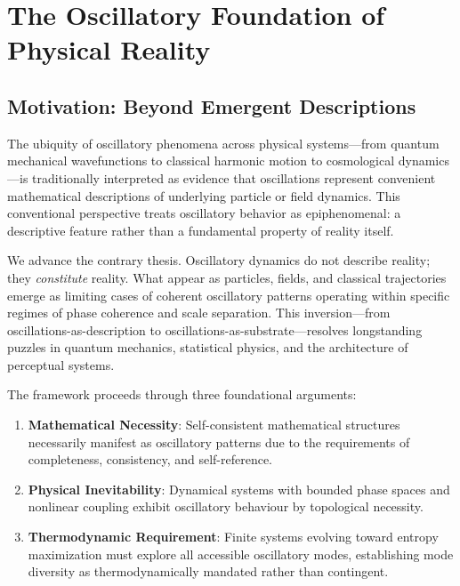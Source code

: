 

\section{The Oscillatory Foundation of Physical Reality}

\subsection{Motivation: Beyond Emergent Descriptions}

The ubiquity of oscillatory phenomena across physical systems—from quantum mechanical wavefunctions to classical harmonic motion to cosmological dynamics—is traditionally interpreted as evidence that oscillations represent convenient mathematical descriptions of underlying particle or field dynamics. This conventional perspective treats oscillatory behavior as epiphenomenal: a descriptive feature rather than a fundamental property of reality itself.

We advance the contrary thesis. Oscillatory dynamics do not describe reality; they \textit{constitute} reality. What appear as particles, fields, and classical trajectories emerge as limiting cases of coherent oscillatory patterns operating within specific regimes of phase coherence and scale separation. This inversion—from oscillations-as-description to oscillations-as-substrate—resolves longstanding puzzles in quantum mechanics, statistical physics, and the architecture of perceptual systems.

The framework proceeds through three foundational arguments:

\begin{enumerate}
\item \textbf{Mathematical Necessity}: Self-consistent mathematical structures necessarily manifest as oscillatory patterns due to the requirements of completeness, consistency, and self-reference.

\item \textbf{Physical Inevitability}: Dynamical systems with bounded phase spaces and nonlinear coupling exhibit oscillatory behaviour by topological necessity.

\item \textbf{Thermodynamic Requirement}: Finite systems evolving toward entropy maximization must explore all accessible oscillatory modes, establishing mode diversity as thermodynamically mandated rather than contingent.
\end{enumerate}

